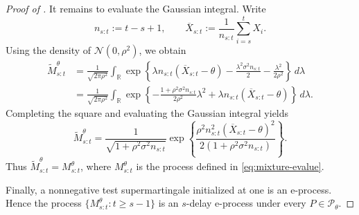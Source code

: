 \documentclass[12pt]{article}
\theoremstyle{spaced}
\theoremstyle{remark}
\begin{document}
\begin{proof}[Proof of ]
It remains to evaluate the Gaussian integral. Write
\[
n_{s:t}:=t-s+1,
\qquad
\overline X_{s:t}
:=
\frac{1}{n_{s:t}}\sum_{i=s}^{t}X_i.
\]
Using the density of $\mathcal N(0,\rho^2)$, we obtain
\begin{align*}
\widetilde M_{s:t}^{\theta}
&=
\frac{1}{\sqrt{2\pi\rho^2}}
\int_{\mathbb R}
\exp\left\{
\lambda n_{s:t}
(\overline X_{s:t}-\theta)
-\frac{\lambda^2\sigma^2n_{s:t}}{2}
-\frac{\lambda^2}{2\rho^2}
\right\}
\,d\lambda \\
&=
\frac{1}{\sqrt{2\pi\rho^2}}
\int_{\mathbb R}
\exp\left\{
-\frac{1+\rho^2\sigma^2n_{s:t}}{2\rho^2}
\lambda^2
+
\lambda n_{s:t}
(\overline X_{s:t}-\theta)
\right\}
\,d\lambda.
\end{align*}
Completing the square and evaluating the Gaussian integral yields
\[
\widetilde M_{s:t}^{\theta}
=
\frac{1}{
\sqrt{1+\rho^2\sigma^2n_{s:t}}
}
\exp\left\{
\frac{
\rho^2n_{s:t}^2
(\overline X_{s:t}-\theta)^2
}{
2\left(1+\rho^2\sigma^2n_{s:t}\right)
}
\right\}.
\]
Thus $\widetilde M_{s:t}^{\theta}=M_{s:t}^{\theta}$, where
$M_{s:t}^{\theta}$ is the process defined in \eqref{eq:mixture-evalue}.

Finally, a nonnegative test supermartingale initialized at one is an
e-process.  Hence the process
$\{M_{s:t}^{\theta}:t\ge s-1\}$ is an $s$-delay e-process under every
$P\in\mathcal P_\theta$.
\end{proof}
\end{document}
